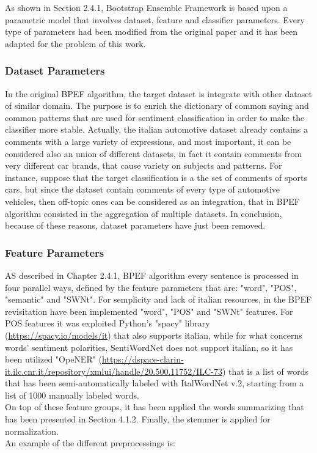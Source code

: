 As shown in Section 2.4.1, Bootstrap Ensemble Framework is based upon a parametric model that involves dataset, feature and classifier parameters. Every type of parameters had been modified from the original paper and it has been adapted for the problem of this work.

\subsubsection{Dataset Parameters}

In the original BPEF algorithm, the target dataset is integrate with other dataset of similar domain. The purpose is to enrich the dictionary of common saying and common patterns that are used for sentiment classification in order to make the classifier more stable. Actually, the italian automotive dataset already contains a comments with a large variety of expressions, and most important, it can be considered also an union of different datasets, in fact it contain comments from very different car brands, that cause variety on subjects and patterns. For instance, suppose that the target classification is a the set of comments of sports cars, but since the dataset contain comments of every type of automotive vehicles, then off-topic ones can be considered as an integration, that in BPEF algorithm consisted in the aggregation of multiple datasets. In conclusion, because of these reasons, dataset parameters have just been removed.


\subsubsection{Feature Parameters}

AS described in Chapter 2.4.1, BPEF algorithm every sentence is processed in four parallel ways, defined by the feature parameters that are: "word", "POS", "semantic" and "SWNt". For semplicity and lack of italian resources, in the BPEF revisitation have been implemented "word", "POS" and "SWNt" features. For POS features it was exploited Python's "spacy" library (\url{https://spacy.io/models/it}) that also supports italian, while for what  concerns words' sentiment polarities, SentiWordNet does not support italian, so it has been utilized "OpeNER" (\url{https://dspace-clarin-it.ilc.cnr.it/repository/xmlui/handle/20.500.11752/ILC-73}) that is a list of words that has been semi-automatically labeled with ItalWordNet v.2, starting from a list of 1000 manually labeled words.\\
On top of these feature groups, it has been applied the words summarizing that has been presented in Section 4.1.2. Finally, the stemmer is applied for normalization.\\
An example of the different preprocessings is:

